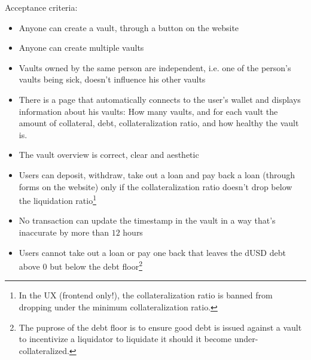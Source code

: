 \documentclass{article} %
\begin{document}
Acceptance criteria:
\begin{itemize}
  \item Anyone can create a vault, through a button on the website
  \item Anyone can create multiple vaults
  \item Vaults owned by the same person are independent, i.e. one of the
    person's vaults being sick, doesn't influence his other vaults
  \item There is a page that automatically connects to the user's wallet and
    displays information about his vaults: How many vaults, and for each vault
    the amount of collateral, debt, collateralization ratio, and how healthy the
    vault is.
  \item The vault overview is correct, clear and aesthetic
  \item Users can deposit, withdraw, take out a loan and pay back a loan
    (through forms on the website) only if the collateralization ratio doesn't
    drop below the liquidation ratio\footnote{
      In the UX (frontend only!), the collateralization ratio is banned from
      dropping under the minimum collateralization ratio.}
  \item No transaction can update the timestamp in the vault in a way that's
    inaccurate by more than $12$ hours
  \item Users cannot take out a loan or pay one back that leaves the dUSD debt
    above $0$ but below the debt floor\footnote{
    The puprose of the debt floor is to ensure good debt is issued against a
    vault to incentivize a liquidator to liquidate it should it become
    under-collateralized.}
% 


\end{itemize}
\end{document}
